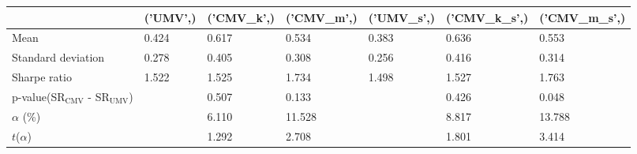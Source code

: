 \begin{tabular}{lllllll}
\toprule
 & ('UMV',) & ('CMV_k',) & ('CMV_m',) & ('UMV_s',) & ('CMV_k_s',) & ('CMV_m_s',) \\
\midrule
Mean & 0.424 & 0.617 & 0.534 & 0.383 & 0.636 & 0.553 \\
Standard deviation & 0.278 & 0.405 & 0.308 & 0.256 & 0.416 & 0.314 \\
Sharpe ratio & 1.522 & 1.525 & 1.734 & 1.498 & 1.527 & 1.763 \\
p-value(SR$_{\text{CMV}}$ - SR$_{\text{UMV}}$) &  & 0.507 & 0.133 &  & 0.426 & 0.048 \\
$\alpha$ (\%) &  & 6.110 & 11.528 &  & 8.817 & 13.788 \\
$t$($\alpha$) &  & 1.292 & 2.708 &  & 1.801 & 3.414 \\
\bottomrule
\end{tabular}
